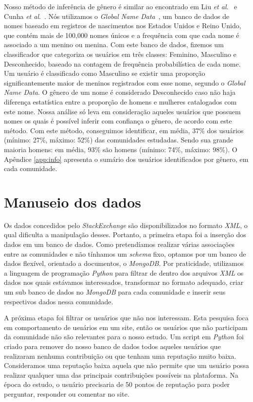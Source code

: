 Nosso método de inferência de gênero é similar ao encontrado em Liu \textit{et al}.~\cite{liu2013s} e Cunha \textit{et al}.~\cite{cunha2014he}. Nós utilizamos o \emph{Global Name Data}~\cite{Hyland:2013:Online}, um banco de dados de nomes baseado em registros de nascimentos nos Estados Unidos e Reino Unido, que contém mais de 100,000 nomes únicos e a frequência com que cada nome é associado a um menino ou menina. Com este banco de dados, fizemos um classificador que categoriza os usuários em três classes: Feminino, Masculino e Desconhecido, baseado na contagem de frequência probabilística de cada nome. Um usuário é classificado como Masculino se existir uma proporção significantemente maior de meninos registrados com esse nome, segundo o \emph{Global Name Data}. O gênero de um nome é considerado Desconhecido caso não haja diferença estatística entre a proporção de homens e mulheres catalogados com este nome. Nossa análise só leva em consideração aqueles usuários que possuem nomes os quais é possível inferir com confiança o gênero, de acordo com este método. Com este método, conseguimos identificar, em média, 37\% dos usuários (mínimo: 27\%, máximo: 52\%) das comunidades estudadas. Sendo sua grande maioria homens: em média, 93\% são homens (mínimo: 74\%, máximo: 98\%). O Apêndice \ref{app:info} apresenta o sumário dos usuários identificados por gênero, em cada comunidade.

\section{Manuseio dos dados}

Os dados concedidos pelo \emph{StackExchange} são disponibilizados no formato \emph{XML}, o qual dificulta a manipulação desses. Portanto, a primeira etapa foi a inserção dos dados em um banco de dados. Como pretendíamos realizar várias associações entre as comunidades e não tínhamos um \emph{schema} fixo, optamos por um banco de dados flexível, orientado a documentos, o \emph{MongoDB}. Por praticidade, utilizamos a linguagem de programação \emph{Python} para filtrar de dentro dos arquivos \emph{XML} os dados nos quais estávamos interessados, transformar no formato adequado, criar um sub banco de dados no \emph{MongoDB} para cada comunidade e inserir seus respectivos dados nessa comunidade.

A próxima etapa foi filtrar os usuários que não nos interessam. Esta pesquisa foca em comportamento de usuários em um site, então os usuários que não participam da comunidade não são relevantes para o nosso estudo. Um script em \emph{Python} foi criado para remover do nosso banco de dados todos aqueles usuários que realizaram nenhuma contribuição ou que tenham uma reputação muito baixa. Consideramos uma reputação baixa aquela que não permite que um usuário possa realizar qualquer uma das principais contribuições possíveis na plataforma. Na época do estudo, o usuário precisaria de 50 pontos de reputação para poder perguntar, responder ou comentar no site.


